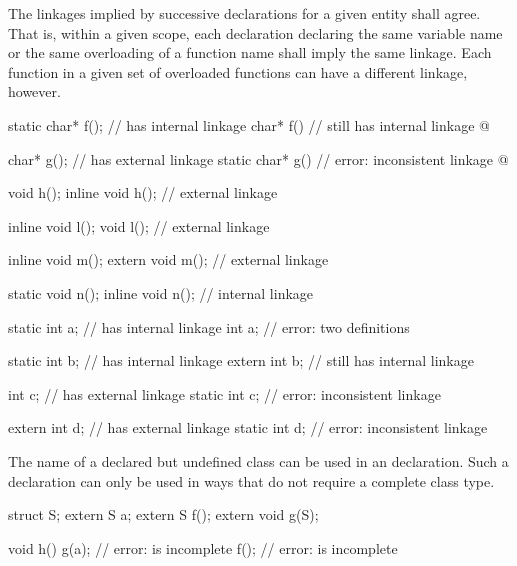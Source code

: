 \pnum
The linkages implied by successive declarations for a given entity shall
agree. That is, within a given scope, each declaration declaring the
same variable name or the same overloading of a function name shall imply
the same linkage. Each function in a given set of overloaded functions
can have a different linkage, however.
\begin{example}
\begin{codeblock}
static char* f();               //  has internal linkage
char* f()                       //  still has internal linkage
  { @\commentellip@ }

char* g();                      //  has external linkage
static char* g()                // error: inconsistent linkage
  { @\commentellip@ }

void h();
inline void h();                // external linkage

inline void l();
void l();                       // external linkage

inline void m();
extern void m();                // external linkage

static void n();
inline void n();                // internal linkage

static int a;                   //  has internal linkage
int a;                          // error: two definitions

static int b;                   //  has internal linkage
extern int b;                   //  still has internal linkage

int c;                          //  has external linkage
static int c;                   // error: inconsistent linkage

extern int d;                   //  has external linkage
static int d;                   // error: inconsistent linkage
\end{codeblock}
\end{example}

\pnum
{}%
The name of a declared but undefined class can be used in an
 declaration. Such a declaration can only be used in ways
that do not require a complete class type.
\begin{example}
\begin{codeblock}
struct S;
extern S a;
extern S f();
extern void g(S);

void h() {
  g(a);                         // error:  is incomplete
  f();                          // error:  is incomplete
}
\end{codeblock}
\end{example}

